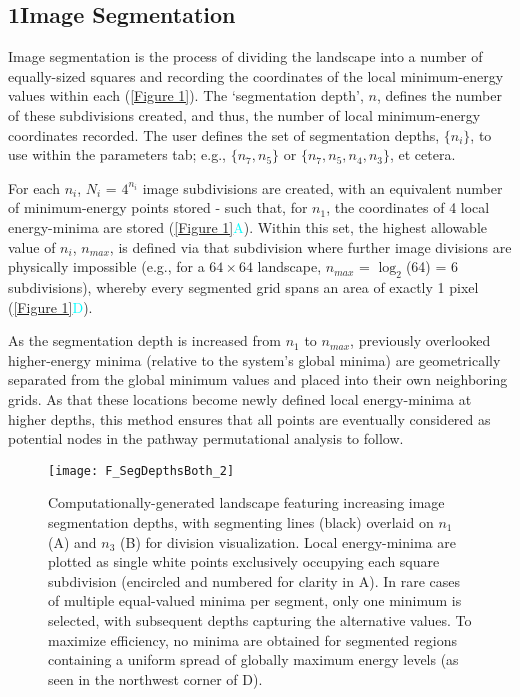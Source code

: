 \documentclass[twocolumn]{biophys-new}
\begin{document}
\subsection*{1\quad Image Segmentation}

Image segmentation is the process of dividing the landscape into a number of equally-sized squares and recording the coordinates of the local minimum-energy values within each (\autoref{Figure 1}). The `segmentation depth', $n$, defines the number of these subdivisions created, and thus, the number of local minimum-energy coordinates recorded. The user defines the set of segmentation depths, $\{n_i\}$, to use within the parameters tab; e.g., $\{n_7, n_5\}$ or $\{n_7, n_5, n_4, n_3\}$, et cetera. 

For each $n_i$, $N_{i}$ = $4^{n_{i}}$ image subdivisions are created, with an equivalent number of minimum-energy points stored - such that, for $n_{1}$, the coordinates of 4 local energy-minima are stored (\autoref{Figure 1}\textcolor{cyan}{A}). Within this set, the highest allowable value of $n_{i}$, $n_{max}$, is defined via that subdivision where further image divisions are physically impossible (e.g., for a $64{\times}64$ landscape, $n_{max}$ = $\log_{2}$(64) = 6 subdivisions), whereby every segmented grid spans an area of exactly 1 pixel (\autoref{Figure 1}\textcolor{cyan}{D}).

As the segmentation depth is increased from $n_{1}$ to $n_{max}$, previously overlooked higher-energy minima (relative to the system's global minima) are geometrically separated from the global minimum values and placed into their own neighboring grids. As that these locations become newly defined local energy-minima at higher depths, this method ensures that all points are eventually considered as potential nodes in the pathway permutational analysis to follow.

\setcounter{figure}{0} 
\begin{figure}[hbt!]
\centering
\texttt{[image: F\_SegDepthsBoth\_2]}
\caption{Computationally-generated landscape featuring increasing image segmentation depths, with segmenting lines (black) overlaid on $n_{1}$ (A) and $n_{3}$ (B) for division visualization. Local energy-minima are plotted as single white points exclusively occupying each square subdivision (encircled and numbered for clarity in A). In rare cases of multiple equal-valued minima per segment, only one minimum is selected, with subsequent depths capturing the alternative values. To maximize efficiency, no minima are obtained for segmented regions containing a uniform spread of globally maximum energy levels (as seen in the northwest corner of D).}
\label{Figure 1}
\end{figure}
\end{document}
